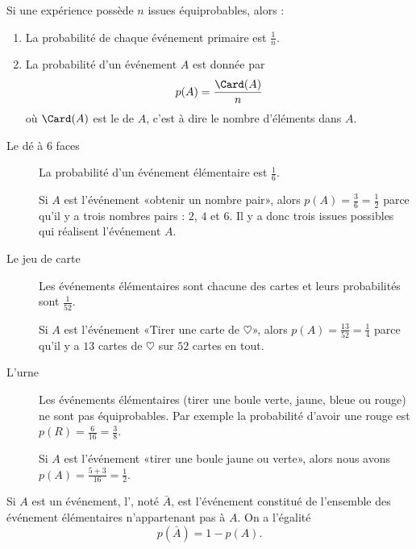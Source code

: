 \begin{propriete}
    Si une expérience possède \( n\) issues équiprobables, alors :
    \begin{enumerate}
        \item
            La probabilité de chaque événement primaire est \( \frac{1}{ n }\).
        \item
            La probabilité d'un événement \( A\) est donnée par
            \begin{equation}
                p(A)=\frac{ \Card(A) }{ n }
            \end{equation}
            où \( \Card(A)\) est le  de \( A\), c'est à dire le nombre d'éléments dans \( A\).
    \end{enumerate}
\end{propriete}

\begin{example}
    \begin{description}
        \item[Le dé à 6 faces]
            La probabilité d'un événement élémentaire est \( \frac{1}{ 6 }\).

            Si \( A\) est l'événement «obtenir un nombre pair», alors \( p(A)=\frac{ 3 }{ 6 }=\frac{ 1 }{2}\) parce qu'il y a trois nombres pairs : \( 2\), \( 4\) et \( 6\). Il y a donc trois issues possibles qui réalisent l'événement \( A\).
        \item[Le jeu de carte]
            Les événements élémentaires sont chacune des cartes et leurs probabilités sont \( \frac{1}{ 52 }\). 
            
            
            Si \( A\) est l'événement «Tirer une carte de \( \heartsuit\)», alors \( p(A)=\frac{ 13 }{ 52 }=\frac{1}{ 4 }\) parce qu'il y a \( 13\) cartes de \( \heartsuit\) sur \( 52\) cartes en tout.

        \item[L'urne] Les événements élémentaires (tirer une boule verte, jaune, bleue ou rouge) ne sont pas équiprobables. Par exemple la probabilité d'avoir une rouge est \( p(R)=\frac{ 6 }{ 16 }=\frac{ 3 }{ 8 }\).

            Si \( A\) est l'événement «tirer une boule jaune ou verte», alors nous avons \( p(A)=\frac{ 5+3 }{ 16 }=\frac{ 1 }{ 2 }\).
    \end{description}
\end{example}

\begin{definition}
    Si \( A\) est un événement, l', noté \( \bar A\), est l'événement constitué de l'ensemble des événement élémentaires n'appartenant pas à \( A\). On a l'égalité
    \begin{equation}
        p(\bar A)=1-p(A).
    \end{equation}
\end{definition}

